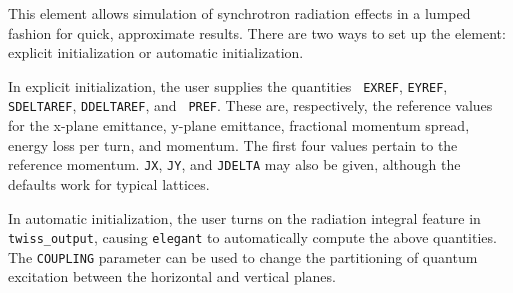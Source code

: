 This element allows simulation of synchrotron radiation effects in a
lumped fashion for quick, approximate results.  There are two ways to
set up the element: explicit initialization or automatic
initialization.  

In explicit initialization, the user supplies the quantities {\tt
EXREF}, {\tt EYREF}, {\tt SDELTAREF}, {\tt DDELTAREF}, and {\tt
PREF}.  These are, respectively, the reference values for the x-plane
emittance, y-plane emittance, fractional momentum spread, energy loss
per turn, and momentum.  The first four values pertain to the
reference momentum.  {\tt JX}, {\tt JY}, and {\tt JDELTA} may also
be given, although the defaults work for typical lattices.

In automatic initialization, the user turns on the radiation integral
feature in {\tt twiss\_output}, causing {\tt elegant} to automatically
compute the above quantities.  The {\tt COUPLING} parameter can be used
to change the partitioning of quantum excitation between the horizontal
and vertical planes.
